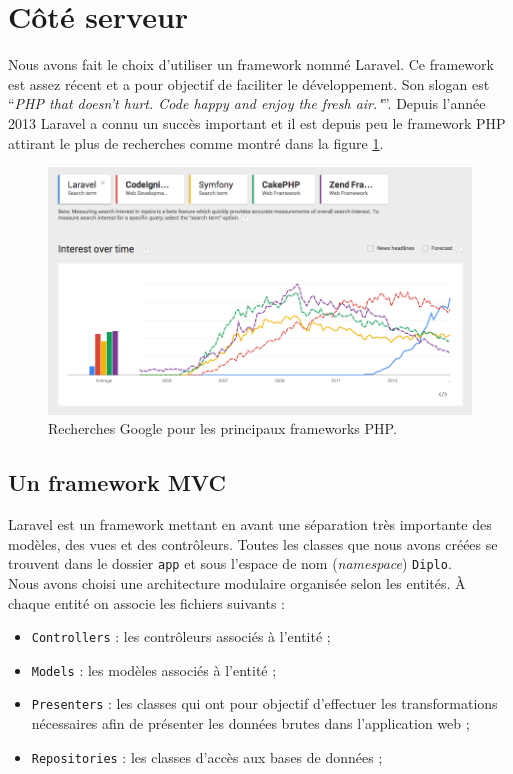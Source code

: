 \section{Côté serveur}
	Nous avons fait le choix d'utiliser un framework nommé Laravel. Ce framework est assez récent et a pour objectif de faciliter le développement. Son slogan est \enquote{\textit{PHP that doesn't hurt. Code happy and enjoy the fresh air."}}. Depuis l'année 2013 Laravel a connu un succès important et il est depuis peu le framework PHP attirant le plus de recherches comme montré dans la figure \ref{fig:trends-php-frameworks}.

	\begin{figure}[H]
		\centering
		\includegraphics[width=1\textwidth]{images/trends-php-frameworks.png}
		\caption{Recherches Google pour les principaux frameworks PHP.}
		\label{fig:trends-php-frameworks}
	\end{figure}

	\subsection{Un framework MVC}
		Laravel est un framework mettant en avant une séparation très importante des modèles, des vues et des contrôleurs. Toutes les classes que nous avons créées se trouvent dans le dossier \verb|app| et sous l'espace de nom (\textit{namespace}) \verb|Diplo|.\\

		Nous avons choisi une architecture modulaire organisée selon les entités. À chaque entité on associe les fichiers suivants :
		\begin{itemize}
			\item \verb|Controllers| : les contrôleurs associés à l'entité ;
			\item \verb|Models| : les modèles associés à l'entité ;
			\item \verb|Presenters| : les classes qui ont pour objectif d'effectuer les transformations nécessaires afin de présenter les données brutes dans l'application web ;
			\item \verb|Repositories| : les classes d'accès aux bases de données ;
		\end{itemize}


